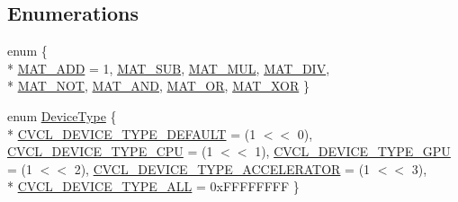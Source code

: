 \subsection*{Enumerations}
\begin{DoxyCompactItemize}
\item 
enum \{ \\*
\hyperlink{namespacecv_1_1ocl_af9c7cf8b90187058d71aa9b954dda9d1a68be6d29df28739a6064939a22219ac9}{M\-A\-T\-\_\-\-A\-D\-D} = 1, 
\hyperlink{namespacecv_1_1ocl_af9c7cf8b90187058d71aa9b954dda9d1a55bce0ca4238b5dd4e257631826cea91}{M\-A\-T\-\_\-\-S\-U\-B}, 
\hyperlink{namespacecv_1_1ocl_af9c7cf8b90187058d71aa9b954dda9d1abf5aae9431212563651b804e6617caf0}{M\-A\-T\-\_\-\-M\-U\-L}, 
\hyperlink{namespacecv_1_1ocl_af9c7cf8b90187058d71aa9b954dda9d1a8aa740358b4ce1cb8f1f93dea471e468}{M\-A\-T\-\_\-\-D\-I\-V}, 
\\*
\hyperlink{namespacecv_1_1ocl_af9c7cf8b90187058d71aa9b954dda9d1a0d5f602f435513ff971dc811017d7090}{M\-A\-T\-\_\-\-N\-O\-T}, 
\hyperlink{namespacecv_1_1ocl_af9c7cf8b90187058d71aa9b954dda9d1a78cd693484c3d34654961d6e4e12d899}{M\-A\-T\-\_\-\-A\-N\-D}, 
\hyperlink{namespacecv_1_1ocl_af9c7cf8b90187058d71aa9b954dda9d1a864b2351c5e08702682e0327e768dc94}{M\-A\-T\-\_\-\-O\-R}, 
\hyperlink{namespacecv_1_1ocl_af9c7cf8b90187058d71aa9b954dda9d1a43ba69bce0942a5a58ec926e392ffc01}{M\-A\-T\-\_\-\-X\-O\-R}
 \}
\item 
enum \hyperlink{namespacecv_1_1ocl_ab965d48273d9ddc69bcb0fbd2d7de77e}{Device\-Type} \{ \\*
\hyperlink{namespacecv_1_1ocl_ab965d48273d9ddc69bcb0fbd2d7de77ea7a6a0f00a88c859c196a894845e43064}{C\-V\-C\-L\-\_\-\-D\-E\-V\-I\-C\-E\-\_\-\-T\-Y\-P\-E\-\_\-\-D\-E\-F\-A\-U\-L\-T} = (1 $<$$<$ 0), 
\hyperlink{namespacecv_1_1ocl_ab965d48273d9ddc69bcb0fbd2d7de77eaa58b014698260ccf131b67d5f6af1e21}{C\-V\-C\-L\-\_\-\-D\-E\-V\-I\-C\-E\-\_\-\-T\-Y\-P\-E\-\_\-\-C\-P\-U} = (1 $<$$<$ 1), 
\hyperlink{namespacecv_1_1ocl_ab965d48273d9ddc69bcb0fbd2d7de77ea889ff1d8474cb5a5239958bf70d901bc}{C\-V\-C\-L\-\_\-\-D\-E\-V\-I\-C\-E\-\_\-\-T\-Y\-P\-E\-\_\-\-G\-P\-U} = (1 $<$$<$ 2), 
\hyperlink{namespacecv_1_1ocl_ab965d48273d9ddc69bcb0fbd2d7de77ea80cd2682fbcb1a5f1b8d4b114f1944f8}{C\-V\-C\-L\-\_\-\-D\-E\-V\-I\-C\-E\-\_\-\-T\-Y\-P\-E\-\_\-\-A\-C\-C\-E\-L\-E\-R\-A\-T\-O\-R} = (1 $<$$<$ 3), 
\\*
\hyperlink{namespacecv_1_1ocl_ab965d48273d9ddc69bcb0fbd2d7de77eaf647dc0ad67fa19d96fc37c480333da7}{C\-V\-C\-L\-\_\-\-D\-E\-V\-I\-C\-E\-\_\-\-T\-Y\-P\-E\-\_\-\-A\-L\-L} = 0x\-F\-F\-F\-F\-F\-F\-F\-F
 \}
\item 

\end{DoxyCompactItemize}
